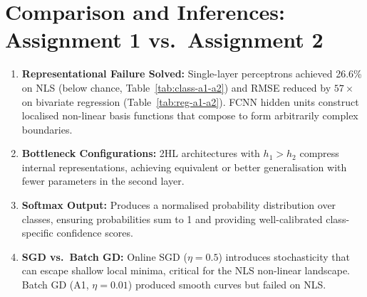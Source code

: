 \documentclass[11pt,a4paper]{article}
\begin{document}
\section{Comparison and Inferences: Assignment 1 vs.\ Assignment 2}

\begin{enumerate}
    \item \textbf{Representational Failure Solved:} Single-layer perceptrons achieved 26.6\% on NLS (below chance, Table~\ref{tab:class-a1-a2}) and RMSE reduced by $57\times$ on bivariate regression (Table~\ref{tab:reg-a1-a2}). FCNN hidden units construct localised non-linear basis functions that compose to form arbitrarily complex boundaries.
    \item \textbf{Bottleneck Configurations:} 2HL architectures with $h_1>h_2$ compress internal representations, achieving equivalent or better generalisation with fewer parameters in the second layer.
    \item \textbf{Softmax Output:} Produces a normalised probability distribution over classes, ensuring probabilities sum to 1 and providing well-calibrated class-specific confidence scores.
    \item \textbf{SGD vs.\ Batch GD:} Online SGD ($\eta=0.5$) introduces stochasticity that can escape shallow local minima, critical for the NLS non-linear landscape. Batch GD (A1, $\eta=0.01$) produced smooth curves but failed on NLS.
\end{enumerate}

\end{document}
